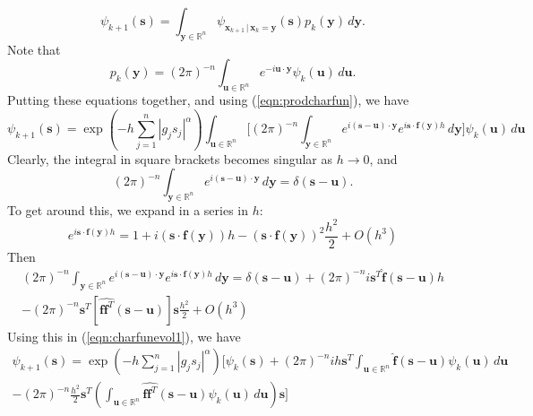 \documentclass[12pt]{article}
\begin{document}
\[
\psi_{k+1}(\mathbf{s}) = \int_{\mathbf{y} \in \mathbb{R}^n} \psi_{\mathbf{x}_{k+1} \, | \, \mathbf{x}_k = \mathbf{y}}(\mathbf{s}) p_k(\mathbf{y}) \, d \mathbf{y}.
\]
Note that
\[
p_k(\mathbf{y}) = (2 \pi)^{-n} \int_{\mathbf{u} \in \mathbb{R}^n}  e^{-i \mathbf{u} \cdot \mathbf{y}} \psi_k(\mathbf{u}) \, d \mathbf{u}.
\]
Putting these equations together, and using (\ref{eqn:prodcharfun}), we have
\begin{equation}
\label{eqn:charfunevol1}
\psi_{k+1}(\mathbf{s}) = \exp\left( -h \sum_{j=1}^n |g_j s_j|^\alpha \right) \int_{ \mathbf{u} \in \mathbb{R}^n }  \biggl[ (2 \pi)^{-n} \int_{\mathbf{y} \in \mathbb{R}^n} e^{i (\mathbf{s} - \mathbf{u}) \cdot \mathbf{y}} e^{i \mathbf{s} \cdot \mathbf{f}(\mathbf{y}) h }  \, d \mathbf{y} \biggr] \psi_k(\mathbf{u})  \, d \mathbf{u}
\end{equation}
Clearly, the integral in square brackets becomes singular as $h \to 0$, and
\[
(2 \pi)^{-n} \int_{\mathbf{y} \in \mathbb{R}^n} e^{i (\mathbf{s} - \mathbf{u}) \cdot \mathbf{y}}  \, d \mathbf{y} = \delta( \mathbf{s} - \mathbf{u} ).
\]
To get around this, we expand in a series in $h$:
\[
e^{i \mathbf{s} \cdot \mathbf{f}(\mathbf{y}) h } = 1 + i (\mathbf{s} \cdot \mathbf{f}(\mathbf{y}) ) h - (\mathbf{s} \cdot \mathbf{f}(\mathbf{y}))^2 \frac{h^2}{2} + O(h^3)
\]
Then
\begin{multline*}
(2 \pi)^{-n} \int_{\mathbf{y} \in \mathbb{R}^n} e^{i (\mathbf{s} - \mathbf{u}) \cdot \mathbf{y}}  e^{i \mathbf{s} \cdot \mathbf{f}(\mathbf{y}) h } \, d \mathbf{y} = \delta( \mathbf{s} - \mathbf{u} ) + (2 \pi)^{-n} i \mathbf{s}^T \widehat{\mathbf{f}}(\mathbf{s}-\mathbf{u}) h \\
- (2 \pi)^{-n} \mathbf{s}^T \left[ \widehat{\mathbf{f} \mathbf{f}^T}(\mathbf{s} - \mathbf{u}) \right] \mathbf{s} \frac{h^2}{2} + O(h^3)
\end{multline*}
Using this in (\ref{eqn:charfunevol1}), we have
\begin{multline}
	\label{eqn:charfunevol2}
\psi_{k+1}(\mathbf{s}) = \exp\left( -h \sum_{j=1}^n |g_j s_j|^\alpha \right) \biggl[ \psi_k(\mathbf{s}) + (2 \pi)^{-n} i h \mathbf{s}^T \int_{\mathbf{u} \in \mathbb{R}^n } \widehat{\mathbf{f}}(\mathbf{s}-\mathbf{u}) \psi_k(\mathbf{u}) \, d \mathbf{u}   \\
 - (2 \pi)^{-n} \frac{h^2}{2} \mathbf{s}^T  \left( \int_{\mathbf{u} \in \mathbb{R}^n} \widehat{\mathbf{f} \mathbf{f}^T}(\mathbf{s} - \mathbf{u})  \psi_k(\mathbf{u}) \, d \mathbf{u} \right)  \mathbf{s} \biggr] 
\end{multline}
\end{document}
